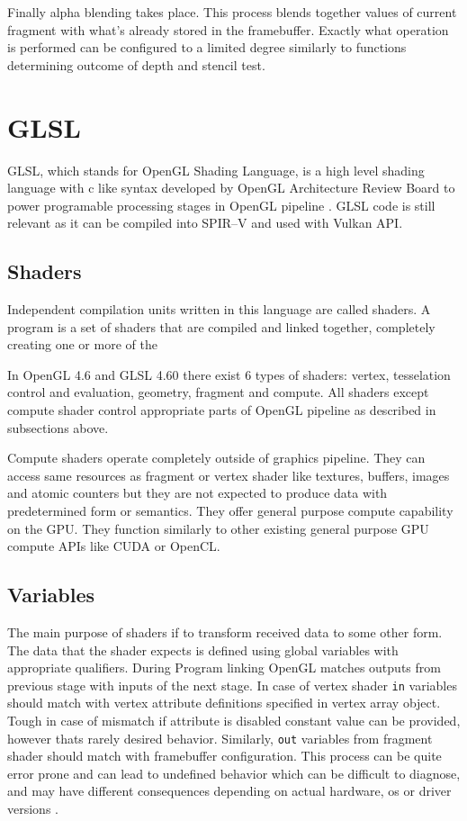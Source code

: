 Finally alpha blending takes place. This process blends together values of current fragment with what's already stored in the framebuffer.
Exactly what operation is performed can be configured to a limited degree similarly to functions determining outcome of depth and stencil test.

\section{GLSL}

GLSL, which stands for OpenGL Shading Language, is a high level shading language with c like syntax developed by OpenGL Architecture Review Board to power programable processing stages in OpenGL pipeline \cite{glslspec}.
GLSL code is still relevant as it can be compiled into SPIR--V and used with Vulkan API.

\subsection*{Shaders}

Independent compilation units written in this language are called shaders. A program is a set of
shaders that are compiled and linked together, completely creating one or more of the

In OpenGL 4.6 and GLSL 4.60 there exist 6 types of shaders: vertex, tesselation control and evaluation, geometry, fragment and compute.
All shaders except compute shader control appropriate parts of OpenGL pipeline as described in subsections above. 

Compute shaders operate completely outside of graphics pipeline. They can access same resources as fragment or vertex shader like textures, buffers, images and atomic counters
but they are not expected to produce data with predetermined form or semantics. They offer general purpose compute capability on the GPU. 
They function similarly to other existing general purpose GPU compute APIs like CUDA or OpenCL.

\subsection{Variables}

The main purpose of shaders if to transform received data to some other form. The data that the shader expects is defined using global variables with appropriate qualifiers.
During Program linking OpenGL matches outputs from previous stage with inputs of the next stage. 
In case of vertex shader \texttt{in} variables should match with vertex attribute definitions specified in vertex array object.
Tough in case of mismatch if attribute is disabled constant value can be provided, however thats rarely desired behavior.
Similarly, \texttt{out} variables from fragment shader should match with framebuffer configuration.
This process can be quite error prone and can lead to undefined behavior which can be difficult to diagnose, and may have different consequences depending on actual hardware, os or driver versions
\cite{glslspec}.

